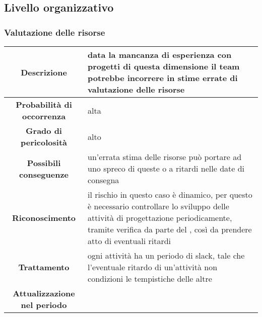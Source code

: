 \documentclass[PianoDiProgetto.tex]{subfiles}
\begin{document}
\clearpage
	\subsection{Livello organizzativo}
	\subsubsection{Valutazione delle risorse}
		\label{sec:lo}


\begin{table}[h]
		\begin{center}
			\begin{tabular}{ | c | p{10cm} |}
				\hline

		 \textbf{Descrizione} & data la mancanza di esperienza con progetti di questa dimensione il team potrebbe incorrere in stime errate di valutazione delle risorse \\ \hline
		 \textbf{Probabilità di occorrenza} & alta \\ \hline
		 \textbf{Grado di pericolosità} & alto \\ \hline
		 \textbf{Possibili conseguenze} & un'errata stima delle risorse può portare ad uno spreco di queste o a ritardi nelle date di consegna \\ \hline
		 \textbf{Riconoscimento} & il rischio in questo caso è dinamico, per questo è necessario controllare lo sviluppo delle attività di progettazione periodicamente, tramite  verifica da parte del \RESP{}, così da prendere atto di eventuali ritardi \\ \hline
		 \textbf{Trattamento} & ogni attività ha un periodo di slack, tale che l'eventuale ritardo di un'attività non condizioni le tempistiche delle altre \\ \hline
		 \textbf{Attualizzazione nel periodo} &


\end{tabular}
\end{center}
\end{table}
\end{document}
